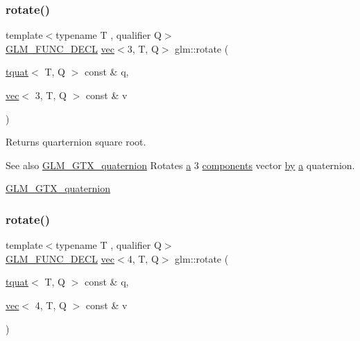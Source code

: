 \subsubsection{\texorpdfstring{rotate()}{rotate()}\hspace{0.1cm}{\footnotesize\ttfamily [1/2]}}
{\footnotesize\ttfamily template$<$typename T , qualifier Q$>$ \\
\hyperlink{setup_8hpp_ab2d052de21a70539923e9bcbf6e83a51}{G\+L\+M\+\_\+\+F\+U\+N\+C\+\_\+\+D\+E\+CL} \hyperlink{structglm_1_1vec}{vec}$<$3, T, Q$>$ glm\+::rotate (\begin{DoxyParamCaption}\item[{\hyperlink{structglm_1_1tquat}{tquat}$<$ T, Q $>$ const \&}]{q,  }\item[{\hyperlink{structglm_1_1vec}{vec}$<$ 3, T, Q $>$ const \&}]{v }\end{DoxyParamCaption})}

Returns quarternion square root.

\begin{DoxySeeAlso}{See also}
\hyperlink{group__gtx__quaternion}{G\+L\+M\+\_\+\+G\+T\+X\+\_\+quaternion} Rotates \hyperlink{_s_d_l__opengl__glext_8h_a3309789fc188587d666cda5ece79cf82}{a} 3 \hyperlink{group__gtx__range_gaf2831875a8cee7cc000abadba2aa1265}{components} vector \hyperlink{_s_d_l__opengl__glext_8h_aee54e9aab2837a54be2ff5fb1c073bd2}{by} \hyperlink{_s_d_l__opengl__glext_8h_a3309789fc188587d666cda5ece79cf82}{a} quaternion.

\hyperlink{group__gtx__quaternion}{G\+L\+M\+\_\+\+G\+T\+X\+\_\+quaternion} 
\end{DoxySeeAlso}
\mbox{\label{group__gtx__quaternion_ga97a5f8af1d63056b85a53ac28042fe77}} 
\subsubsection{\texorpdfstring{rotate()}{rotate()}\hspace{0.1cm}{\footnotesize\ttfamily [2/2]}}
{\footnotesize\ttfamily template$<$typename T , qualifier Q$>$ \\
\hyperlink{setup_8hpp_ab2d052de21a70539923e9bcbf6e83a51}{G\+L\+M\+\_\+\+F\+U\+N\+C\+\_\+\+D\+E\+CL} \hyperlink{structglm_1_1vec}{vec}$<$4, T, Q$>$ glm\+::rotate (\begin{DoxyParamCaption}\item[{\hyperlink{structglm_1_1tquat}{tquat}$<$ T, Q $>$ const \&}]{q,  }\item[{\hyperlink{structglm_1_1vec}{vec}$<$ 4, T, Q $>$ const \&}]{v }\end{DoxyParamCaption})}

